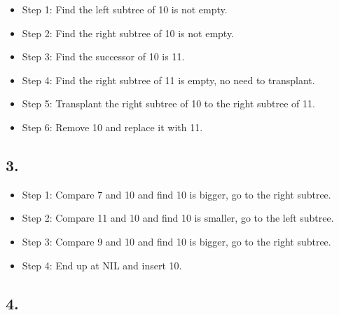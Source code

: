 \documentclass[a4paper,12pt]{article}
\begin{document}
\begin{itemize}
	\item Step 1: Find the left subtree of 10 is not empty.
	\item Step 2: Find the right subtree of 10 is not empty.
	\item Step 3: Find the successor of 10 is 11.
	\item Step 4: Find the right subtree of 11 is empty, no need to transplant.
	\item Step 5: Transplant the right subtree of 10 to the right subtree of 11.
	\item Step 6: Remove 10 and replace it with 11.
\end{itemize}

\subsection*{3.}

\begin{center}
\end{center}

\begin{itemize}
	\item Step 1: Compare 7 and 10 and find 10 is bigger, go to the right subtree.
	\item Step 2: Compare 11 and 10 and find 10 is smaller, go to the left subtree.
	\item Step 3: Compare 9 and 10 and find 10 is bigger, go to the right subtree.
	\item Step 4: End up at NIL and insert 10.
\end{itemize}

\subsection*{4.}
\end{document}
